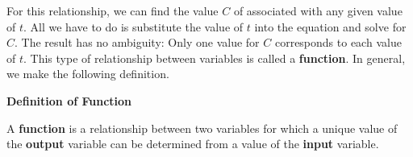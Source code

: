 \documentclass[10pt,]{book}
\newcommand{\terminology}[1]{\textbf{#1}}
\theoremstyle{plain}
\theoremstyle{definition}
\theoremstyle{definition}
\theoremstyle{definition}
\theoremstyle{definition}
\numberwithin{equation}{section}
\begin{document}
    For this relationship, we can find the value \(C\) of associated with any given value of \(t\). All we have to do is substitute the value of \(t\) into the equation and solve for \(C\). The result has no ambiguity: Only one value for \(C\) corresponds to each value of \(t\). This type of relationship between variables is called a \terminology{function}. In general, we make the following definition.
%
\begin{mdframed}[style=assemblage]%
\noindent\textbf{\large Definition of Function}\label{assemblage-4}\par\medskip
A \terminology{function} is a relationship between two variables for which a unique value of the \terminology{output} variable can be determined from a value of the \terminology{input} variable.
\end{mdframed}
\par
\end{document}
